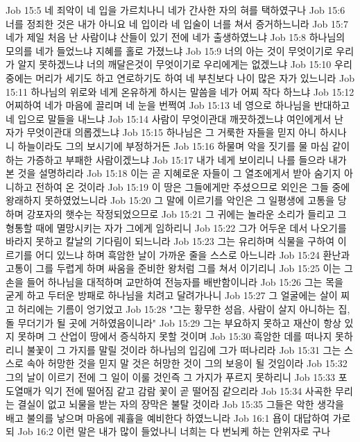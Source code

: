 Job 15:5  네 죄악이 네 입을 가르치나니 네가 간사한 자의 혀를 택하였구나
Job 15:6  너를 정죄한 것은 내가 아니요 네 입이라 네 입술이 너를 쳐서 증거하느니라
Job 15:7  네가 제일 처음 난 사람이냐 산들이 있기 전에 네가 출생하였느냐
Job 15:8  하나님의 모의를 네가 들었느냐 지혜를 홀로 가졌느냐
Job 15:9  너의 아는 것이 무엇이기로 우리가 알지 못하겠느냐 너의 깨달은것이 무엇이기로 우리에게는 없겠느냐
Job 15:10  우리 중에는 머리가 세기도 하고 연로하기도 하여 네 부친보다 나이 많은 자가 있느니라
Job 15:11  하나님의 위로와 네게 온유하게 하시는 말씀을 네가 어찌 작다 하느냐
Job 15:12  어찌하여 네가 마음에 끌리며 네 눈을 번쩍여
Job 15:13  네 영으로 하나님을 반대하고 네 입으로 말들을 내느냐
Job 15:14  사람이 무엇이관대 깨끗하겠느냐 여인에게서 난 자가 무엇이관대 의롭겠느냐
Job 15:15  하나님은 그 거룩한 자들을 믿지 아니 하시나니 하늘이라도 그의 보시기에 부정하거든
Job 15:16  하물며 악을 짓기를 물 마심 같이 하는 가증하고 부패한 사람이겠느냐
Job 15:17  내가 네게 보이리니 나를 들으라 내가 본 것을 설명하리라
Job 15:18  이는 곧 지혜로운 자들이 그 열조에게서 받아 숨기지 아니하고 전하여 온 것이라
Job 15:19  이 땅은 그들에게만 주셨으므로 외인은 그들 중에 왕래하지 못하였었느니라
Job 15:20  그 말에 이르기를 악인은 그 일평생에 고통을 당하며 강포자의 햇수는 작정되었으므로
Job 15:21  그 귀에는 놀라운 소리가 들리고 그 형통할 때에 멸망시키는 자가 그에게 임하리니
Job 15:22  그가 어두운 데서 나오기를 바라지 못하고 칼날의 기다림이 되느니라
Job 15:23  그는 유리하며 식물을 구하여 이르기를 어디 있느냐 하며 흑암한 날이 가까운 줄을 스스로 아느니라
Job 15:24  환난과 고통이 그를 두렵게 하며 싸움을 준비한 왕처럼 그를 쳐서 이기리니
Job 15:25  이는 그 손을 들어 하나님을 대적하며 교만하여 전능자를 배반함이니라
Job 15:26  그는 목을 굳게 하고 두터운 방패로 하나님을 치려고 달려가나니
Job 15:27  그 얼굴에는 살이 찌고 허리에는 기름이 엉기었고
Job 15:28  "그는 황무한 성읍, 사람이 살지 아니하는 집, 돌 무더기가 될 곳에 거하였음이니라"
Job 15:29  그는 부요하지 못하고 재산이 항상 있지 못하며 그 산업이 땅에서 증식하지 못할 것이며
Job 15:30  흑암한 데를 떠나지 못하리니 불꽃이 그 가지를 말릴 것이라 하나님의 입김에 그가 떠나리라
Job 15:31  그는 스스로 속아 허망한 것을 믿지 말 것은 허망한 것이 그의 보응이 될 것임이라
Job 15:32  그의 날이 이르기 전에 그 일이 이룰 것인즉 그 가지가 푸르지 못하리니
Job 15:33  포도열매가 익기 전에 떨어짐 같고 감람 꽃이 곧 떨어짐 같으리라
Job 15:34  사곡한 무리는 결실이 없고 뇌물을 받는 자의 장막은 불탈 것이라
Job 15:35  그들은 악한 생각을 배고 불의를 낳으며 마음에 궤휼을 예비한다 하였느니라
Job 16:1  욥이 대답하여 가로되
Job 16:2  이런 말은 내가 많이 들었나니 너희는 다 번뇌케 하는 안위자로 구나
